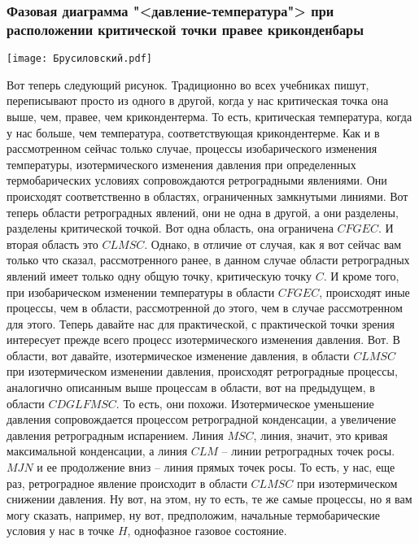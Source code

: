 \documentclass[main.tex]{subfiles}
\begin{document}
\subsubsection{Фазовая диаграмма "<давление-температура"> при расположении критической точки правее криконденбары}

\begin{center}
\texttt{[image: Брусиловский.pdf]}
\end{center}

Вот теперь следующий рисунок.
Традиционно во всех учебниках пишут, переписывают просто из одного в другой, когда у нас критическая точка она выше, чем, правее, чем крикондентерма.
То есть, критическая температура, когда у нас больше, чем
температура, соответствующая крикондентерме.
Как и в рассмотренном сейчас только случае, процессы изобарического изменения температуры, изотермического изменения давления при определенных термобарических условиях сопровождаются ретроградными явлениями.
Они происходят соответственно в областях, ограниченных
замкнутыми линиями.
Вот теперь области ретроградных явлений, они не одна в другой, а они разделены, разделены критической точкой.
Вот одна область, она ограничена $CFGEC$.
И вторая область это $CLMSC$.
Однако, в отличие от случая, как я вот сейчас вам только
что сказал, рассмотренного ранее, в данном случае области
ретроградных явлений имеет только одну общую точку,
критическую точку $C$.
И кроме того, при изобарическом изменении температуры в области $CFGEC$, происходят иные процессы, чем в области, рассмотренной до этого, чем в случае рассмотренном для этого.
Теперь давайте нас для практической, с практической точки зрения интересует прежде всего процесс изотермического изменения давления.
Вот.
В области, вот давайте, изотермическое изменение давления, в области $CLMSC$ при изотермическом изменении давления, происходят ретроградные процессы, аналогично описанным выше процессам в области, вот на предыдущем, в области $CDGLFMSC$.
То есть, они похожи.
Изотермическое уменьшение давления сопровождается процессом ретроградной конденсации, а увеличение давления ретроградным испарением.
Линия $MSC$, линия, значит, это кривая максимальной конденсации, а линия $CLM$ -- линии ретроградных точек росы.
$MJN$ и ее продолжение вниз -- линия прямых точек росы.
То есть, у нас, еще раз, ретроградное явление происходит в области $CLMSC$ при изотермическом снижении давления.
Ну вот, на этом, ну то есть, те же самые процессы, но
я вам могу сказать, например, ну вот, предположим, начальные термобарические условия у нас в точке $H$, однофазное газовое состояние.
\end{document}
